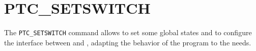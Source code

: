 \section{PTC\_SETSWITCH}
\label{sec:ptc-setswitch}

The \texttt{PTC\_SETSWITCH} command allows to set some global \ptc states and to configure the interface between {\madx} and {\ptc}, adapting the behavior of the program to the needs.   


